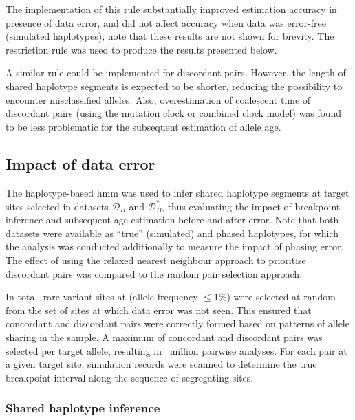 The implementation of this rule substantially improved estimation accuracy in presence of data error, and did not affect accuracy when data was error-free (simulated haplotypes); note that these results are not shown for brevity.
The restriction rule was used to produce the results presented below.

A similar rule could be implemented for discordant pairs.
However, the length of shared haplotype segments is expected to be shorter, reducing the possibility to encounter misclassified alleles.
Also, overestimation of coalescent time of discordant pairs (using the mutation clock or combined clock model) was found to be less problematic for the subsequent estimation of allele age.





%
\subsection{Impact of data error}\label{sec:hhmm_eval}
%

The haplotype-based \gls{hmm} was used to infer shared haplotype segments at target sites selected in datasets $\mathcal{D}_B$ and $\mathcal{D}_B^{\ast}$, thus evaluating the impact of breakpoint inference and subsequent age estimation before and after error.
Note that both datasets were available as ``true'' (simulated) and phased haplotypes, for which the analysis was conducted additionally to measure the impact of phasing error.
The effect of using the relaxed nearest neighbour approach to prioritise discordant pairs was compared to the random pair selection approach.

In total,  rare variant sites at \fk{[2,50]} (allele frequency ${\leq 1\%}$) were selected at random from the set of sites at which data error was not seen.
This ensured that concordant and discordant pairs were correctly formed based on patterns of allele sharing in the sample.
A maximum of  concordant and  discordant pairs was selected per target allele, resulting in ~million pairwise analyses.
For each pair at a given target site, simulation records were scanned to determine the true breakpoint interval along the sequence of segregating sites.


%

%


%
\subsubsection{Shared haplotype inference}
%

